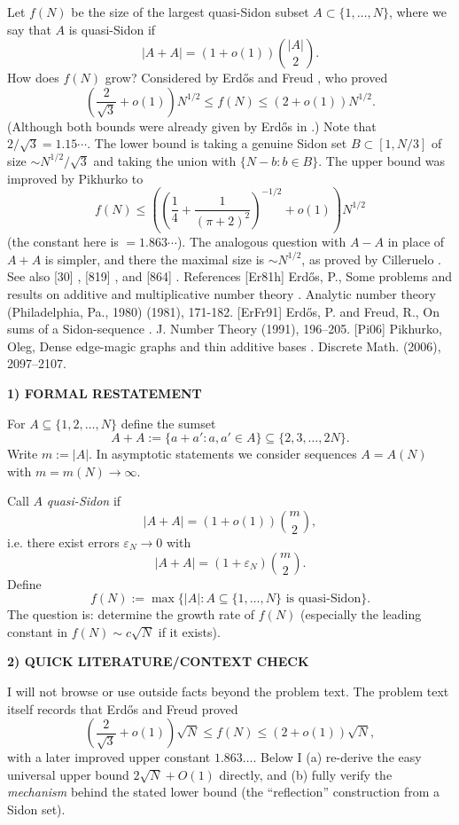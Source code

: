 Let $f(N)$ be the size of the largest quasi-Sidon subset $A\subset\{1,\ldots,N\}$, where we say that $A$ is quasi-Sidon if\[\lvert A+A\rvert=(1+o(1))\binom{\lvert A\rvert}{2}.\]How does $f(N)$ grow? Considered by Erd\H{o}s and Freud \cite{ErFr91}, who proved\[\left(\frac{2}{\sqrt{3}}+o(1)\right)N^{1/2} \leq f(N) \leq \left(2+o(1)\right)N^{1/2}.\](Although both bounds were already given by Erd\H{o}s in \cite{Er81h}.) Note that $2/\sqrt{3}=1.15\cdots$. The lower bound is taking a genuine Sidon set $B\subset [1,N/3]$ of size $\sim N^{1/2}/\sqrt{3}$ and taking the union with $\{N-b : b\in B\}$. The upper bound was improved by Pikhurko \cite{Pi06} to\[f(N) \leq \left(\left(\frac{1}{4}+\frac{1}{(\pi+2)^2}\right)^{-1/2}+o(1)\right)N^{1/2}\](the constant here is $=1.863\cdots$). The analogous question with $A-A$ in place of $A+A$ is simpler, and there the maximal size is $\sim N^{1/2}$, as proved by Cilleruelo . See also [30] , [819] , and [864] . References [Er81h] Erd\H{o}s, P., Some problems and results on additive and multiplicative number theory . Analytic number theory (Philadelphia, Pa., 1980) (1981), 171-182. [ErFr91] Erd\H{o}s, P. and Freud, R., On sums of a {S}idon-sequence . J. Number Theory (1991), 196--205. [Pi06] Pikhurko, Oleg, Dense edge-magic graphs and thin additive bases . Discrete Math. (2006), 2097--2107.

\medskip
\noindent\textbf{1) FORMAL RESTATEMENT}

For $A\subseteq\{1,2,\dots,N\}$ define the sumset
\[
A+A:=\{a+a': a,a'\in A\} \subseteq \{2,3,\dots,2N\}.
\]
Write $m:=|A|$.  In asymptotic statements we consider sequences $A=A(N)$ with $m=m(N)\to\infty$.

Call $A$ \emph{quasi-Sidon} if
\[
|A+A| = (1+o(1))\binom{m}{2},
\]
i.e. there exist errors $\varepsilon_N\to 0$ with
\[
|A+A| = (1+\varepsilon_N)\binom{m}{2}.
\]
Define
\[
f(N):=\max\{|A|: A\subseteq\{1,\dots,N\}\text{ is quasi-Sidon}\}.
\]
The question is: determine the growth rate of $f(N)$ (especially the leading constant in $f(N)\sim c\sqrt N$ if it exists).

\medskip
\noindent\textbf{2) QUICK LITERATURE/CONTEXT CHECK}

I will not browse or use outside facts beyond the problem text.
The problem text itself records that Erd\H{o}s and Freud proved
\[
\left(\frac{2}{\sqrt{3}}+o(1)\right)\sqrt N \le f(N) \le (2+o(1))\sqrt N,
\]
with a later improved upper constant $1.863\dots$.
Below I (a) re-derive the easy universal upper bound $2\sqrt N+O(1)$ directly, and (b) fully verify the \emph{mechanism} behind the stated lower bound (the ``reflection'' construction from a Sidon set).

